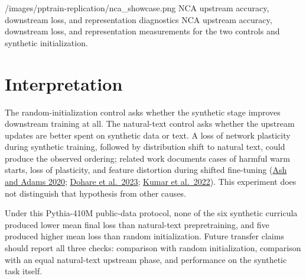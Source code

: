 \documentclass[11pt]{article}
\begin{document}
  {/images/pptrain-replication/nca_showcase.png}
  {NCA upstream accuracy, downstream loss, and representation diagnostics}
  {NCA upstream accuracy, downstream loss, and representation measurements for the two controls and synthetic initialization.}

\section{Interpretation}\label{interpretation}

The random-initialization control asks whether the synthetic stage improves downstream training at all. The natural-text control asks whether the upstream updates are better spent on synthetic data or text. A loss of network plasticity during synthetic training, followed by distribution shift to natural text, could produce the observed ordering; related work documents cases of harmful warm starts, loss of plasticity, and feature distortion during shifted fine-tuning (\href{https://arxiv.org/abs/1910.08475}{Ash and Adams 2020}; \href{https://arxiv.org/abs/2306.13812}{Dohare et al.~2023}; \href{https://arxiv.org/abs/2202.10054}{Kumar et al.~2022}). This experiment does not distinguish that hypothesis from other causes.

Under this Pythia-410M public-data protocol, none of the six synthetic curricula produced lower mean final loss than natural-text prepretraining, and five produced higher mean loss than random initialization. Future transfer claims should report all three checks: comparison with random initialization, comparison with an equal natural-text upstream phase, and performance on the synthetic task itself.
\end{document}
